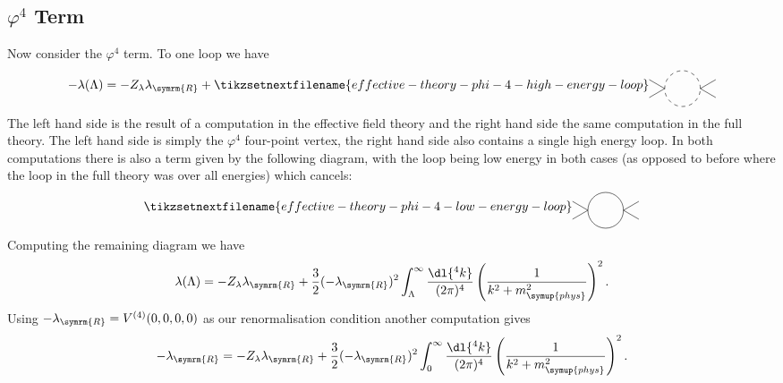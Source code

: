 \documentclass[fleqn]{NotesClass}
\newcommand{\phys}{\symup{phys}}
\newcommand{\renormalised}{\symrm{R}}
\begin{document}
    \subsection{\texorpdfstring{\(\varphi^4\)}{phi-four} Term}
    Now consider the \(\varphi^4\) term.
    To one loop we have
    \begin{equation}
        -\lambda(\Lambda) = -Z_\lambda\lambda_{\renormalised} + 
        \tikzsetnextfilename{effective-theory-phi-4-high-energy-loop}
        \begin{tikzpicture}[baseline=(current bounding box)]
            \draw[dashed] (0, 0) circle [radius = 0.5cm];
            \draw (0.5, 0) -- ++ (30:0.5);
            \draw (0.5, 0) -- ++ (-30:0.5);
            \draw (-0.5, 0) -- ++ (150:0.5);
            \draw (-0.5, 0) -- ++ (210:0.5);
        \end{tikzpicture}
    \end{equation}
    The left hand side is the result of a computation in the effective field theory and the right hand side the same computation in the full theory.
    The left hand side is simply the \(\varphi^4\) four-point vertex, the right hand side also contains a single high energy loop.
    In both computations there is also a term given by the following diagram, with the loop being low energy in both cases (as opposed to before where the loop in the full theory was over all energies) which cancels:
    \begin{equation}
        \tikzsetnextfilename{effective-theory-phi-4-low-energy-loop}
        \begin{tikzpicture}[baseline=(current bounding box)]
            \draw (0, 0) circle [radius = 0.5cm];
            \draw (0.5, 0) -- ++ (30:0.5);
            \draw (0.5, 0) -- ++ (-30:0.5);
            \draw (-0.5, 0) -- ++ (150:0.5);
            \draw (-0.5, 0) -- ++ (210:0.5);
        \end{tikzpicture}
    \end{equation}
    Computing the remaining diagram we have
    \begin{equation}
        \lambda(\Lambda) = -Z_\lambda \lambda_{\renormalised} + \frac{3}{2}(-\lambda_{\renormalised})^2 \int_{\Lambda}^{\infty} \frac{\dl{^4k}}{(2\pi)^4} \left( \frac{1}{k^2 + m_{\phys}^2} \right)^2.
    \end{equation}
    Using \(-\lambda_{\renormalised} = V^{(4)}(0, 0, 0, 0)\) as our renormalisation condition another computation gives
    \begin{equation}
        -\lambda_{\renormalised} = -Z_{\lambda}\lambda_{\renormalised} + \frac{3}{2}(-\lambda_{\renormalised})^2 \int_{0}^{\infty} \frac{\dl{^4k}}{(2\pi)^4} \left( \frac{1}{k^2 + m_{\phys}^2} \right)^2.
    \end{equation}
\end{document}

